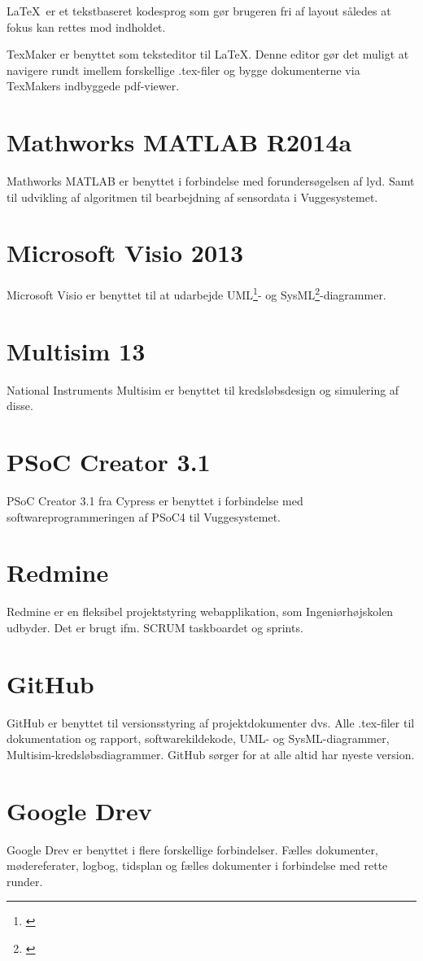 \LaTeX \ er et tekstbaseret kodesprog som gør brugeren fri af layout således at fokus kan rettes mod indholdet.


TexMaker er benyttet som teksteditor til \LaTeX. Denne editor gør det muligt at navigere rundt imellem forskellige .tex-filer og bygge dokumenterne via TexMakers indbyggede pdf-viewer.

\section*{Mathworks MATLAB R2014a}
Mathworks MATLAB er benyttet i forbindelse med forundersøgelsen af lyd. Samt til udvikling af algoritmen til bearbejdning af sensordata i Vuggesystemet.

\section*{Microsoft Visio 2013}
Microsoft Visio er benyttet til at udarbejde UML\footnote{\citep{website:uml}}- og SysML\footnote{\citep{website:sysml}}-diagrammer. 

\section*{Multisim 13}
National Instruments Multisim er benyttet til kredsløbsdesign og simulering af disse. 

\section*{PSoC Creator 3.1}
PSoC Creator 3.1 fra Cypress \citep{website:Cypress} er benyttet i forbindelse med softwareprogrammeringen af PSoC4 til Vuggesystemet. 

\section*{Redmine}
Redmine er en fleksibel projektstyring webapplikation, som Ingeniørhøjskolen udbyder. Det er brugt ifm. SCRUM taskboardet og sprints.

\section*{GitHub}
GitHub er benyttet til versionsstyring af projektdokumenter dvs. Alle .tex-filer til dokumentation og rapport, softwarekildekode, UML- og SysML-diagrammer, Multisim-kredsløbsdiagrammer. GitHub sørger for at alle altid har nyeste version. 

\section*{Google Drev}
Google Drev er benyttet i flere forskellige forbindelser. Fælles dokumenter, mødereferater, logbog, tidsplan og fælles dokumenter i forbindelse med rette runder.